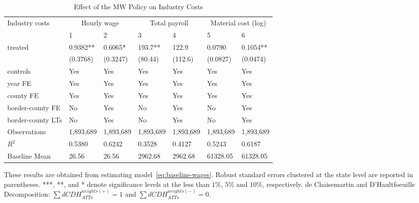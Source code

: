 \begin{table}[H]
    \centering
    \caption{Effect of the MW Policy on Industry Costs}
    \label{tab:baseline-industry-costs}
    \begin{tabular}{@{}lllllll@{}}
        \toprule\toprule
        Industry costs & \multicolumn{2}{c}{Hourly wage} & \multicolumn{2}{c}{Total payroll} & \multicolumn{2}{c}{Material cost (log)} \\
        \cmidrule(lr){2-3}\cmidrule(lr){4-5}\cmidrule(lr){6-7}
        & 1         & 2         & 3         & 4         & 5         & 6         \\ \midrule
        treated           & 0.9382**  & 0.6065*   & 193.7**   & 122.9     & 0.0790    & 0.1054**  \\
        & (0.3768)  & (0.3247)  & (80.44)   & (112.6)   & (0.0827)  & (0.0474)  \\
        controls          & Yes       & Yes       & Yes       & Yes       & Yes       & Yes       \\
        year FE           & Yes       & Yes       & Yes       & Yes       & Yes       & Yes       \\
        county FE         & Yes       & Yes       & Yes       & Yes       & Yes       & Yes       \\
        border-county FE  & No        & Yes       & No        & Yes       & No        & Yes       \\
        border-county LTs & No        & Yes       & No        & Yes       & No        & Yes       \\ \midrule
        Observations      & 1,893,689 & 1,893,689 & 1,893,689 & 1,893,689 & 1,893,689 & 1,893,689 \\
        $R^2$             & 0.5380    & 0.6242    & 0.3528    & 0.4127    & 0.5243    & 0.6187    \\
        Baseline Mean     & 26.56     & 26.56     & 2962.68   & 2962.68   & 61328.05  & 61328.05  \\ \bottomrule \bottomrule
    \end{tabular}
    \begin{minipage}{15.5cm}
        \vspace{0.05in}
        These results are obtained from estimating model~\ref{eq:baseline-wages}. Robust standard errors clustered at the state level are reported in parentheses. ***, **, and * denote significance levels at the less than $1\%$, $5\%$ and $10\%$, respectively. de Chaisemartin and D'Haultfoeuille Decomposition: $\sum dCDH_{ATTs}^{weights(+)} = 1$ and $\sum dCDH_{ATTs}^{weights(-)} = 0$.
    \end{minipage}
\end{table}